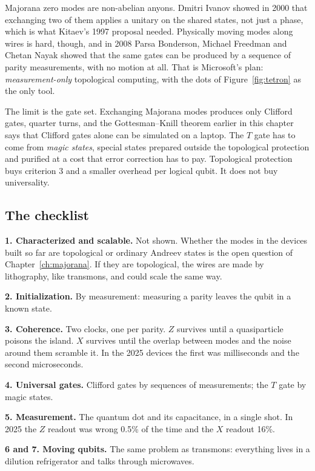 Majorana zero modes are non-abelian anyons. Dmitri Ivanov showed in 2000 that exchanging two of
them applies a unitary on the shared states, not just a phase, which is what Kitaev's 1997
proposal needed. Physically moving modes along wires is hard, though, and in 2008 Parsa
Bonderson, Michael Freedman and Chetan Nayak showed that the same gates can be produced by a
sequence of parity measurements, with no motion at all. That is Microsoft's plan:
\emph{measurement-only} topological computing, with the dots of Figure~\ref{fig:tetron} as the
only tool.

The limit is the gate set. Exchanging Majorana modes produces only Clifford gates, quarter turns,
and the Gottesman--Knill theorem earlier in this chapter says that Clifford gates alone can be
simulated on a laptop. The $T$ gate has to come from \emph{magic states}, special states prepared
outside the topological protection and purified at a cost that error correction has to pay.
Topological protection buys criterion 3 and a smaller overhead per logical qubit. It does not
buy universality.

\subsection*{The checklist}

\textbf{1. Characterized and scalable.} Not shown. Whether the modes in the devices built so far
are topological or ordinary Andreev states is the open question of Chapter~\ref{ch:majorana}. If
they are topological, the wires are made by lithography, like transmons, and could scale the same
way.

\textbf{2. Initialization.} By measurement: measuring a parity leaves the qubit in a known state.

\textbf{3. Coherence.} Two clocks, one per parity. $Z$ survives until a quasiparticle poisons the
island. $X$ survives until the overlap between modes and the noise around them scramble it. In the
2025 devices the first was milliseconds and the second microseconds.

\textbf{4. Universal gates.} Clifford gates by sequences of measurements; the $T$ gate by magic
states.

\textbf{5. Measurement.} The quantum dot and its capacitance, in a single shot. In 2025 the $Z$
readout was wrong 0.5\% of the time and the $X$ readout 16\%.

\textbf{6 and 7. Moving qubits.} The same problem as transmons: everything lives in a
dilution refrigerator and talks through microwaves.

